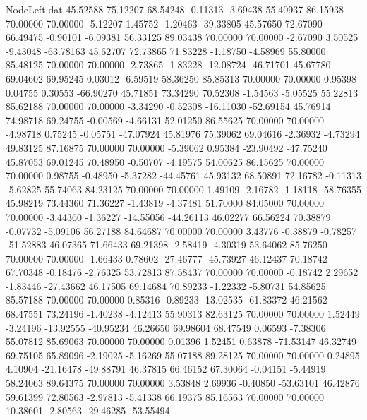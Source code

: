 \begin{filecontents}{NodeLeft.dat}
  45.52588   75.12207   68.54248    -0.11313   -3.69438   55.40937   86.15938   70.00000   70.00000   -5.12207    1.45752   -1.20463  -39.33805
  45.57650   72.67090   66.49475    -0.90101   -6.09381   56.33125   89.03438   70.00000   70.00000   -2.67090    3.50525   -9.43048  -63.78163
  45.62707   72.73865   71.83228    -1.18750   -4.58969   55.80000   85.48125   70.00000   70.00000   -2.73865   -1.83228  -12.08724  -46.71701
  45.67780   69.04602   69.95245     0.03012   -6.59519   58.36250   85.85313   70.00000   70.00000    0.95398    0.04755    0.30553  -66.90270
  45.71851   73.34290   70.52308    -1.54563   -5.05525   55.22813   85.62188   70.00000   70.00000   -3.34290   -0.52308  -16.11030  -52.69154
  45.76914   74.98718   69.24755    -0.00569   -4.66131   52.01250   86.55625   70.00000   70.00000   -4.98718    0.75245   -0.05751  -47.07924
  45.81976   75.39062   69.04616    -2.36932   -4.73294   49.83125   87.16875   70.00000   70.00000   -5.39062    0.95384  -23.90492  -47.75240
  45.87053   69.01245   70.48950    -0.50707   -4.19575   54.00625   86.15625   70.00000   70.00000    0.98755   -0.48950   -5.37282  -44.45761
  45.93132   68.50891   72.16782    -0.11313   -5.62825   55.74063   84.23125   70.00000   70.00000    1.49109   -2.16782   -1.18118  -58.76355
  45.98219   73.44360   71.36227    -1.43819   -4.37481   51.70000   84.05000   70.00000   70.00000   -3.44360   -1.36227  -14.55056  -44.26113
  46.02277   66.56224   70.38879    -0.07732   -5.09106   56.27188   84.64687   70.00000   70.00000    3.43776   -0.38879   -0.78257  -51.52883
  46.07365   71.66433   69.21398    -2.58419   -4.30319   53.64062   85.76250   70.00000   70.00000   -1.66433    0.78602  -27.46777  -45.73927
  46.12437   70.18742   67.70348    -0.18476   -2.76325   53.72813   87.58437   70.00000   70.00000   -0.18742    2.29652   -1.83446  -27.43662
  46.17505   69.14684   70.89233    -1.22332   -5.80731   54.85625   85.57188   70.00000   70.00000    0.85316   -0.89233  -13.02535  -61.83372
  46.21562   68.47551   73.24196    -1.40238   -4.12413   55.90313   82.63125   70.00000   70.00000    1.52449   -3.24196  -13.92555  -40.95234
  46.26650   69.98604   68.47549     0.06593   -7.38306   55.07812   85.69063   70.00000   70.00000    0.01396    1.52451    0.63878  -71.53147
  46.32749   69.75105   65.89096    -2.19025   -5.16269   55.07188   89.28125   70.00000   70.00000    0.24895    4.10904  -21.16478  -49.88791
  46.37815   66.46152   67.30064    -0.04151   -5.44919   58.24063   89.64375   70.00000   70.00000    3.53848    2.69936   -0.40850  -53.63101
  46.42876   59.61399   72.80563    -2.97813   -5.41338   66.19375   85.16563   70.00000   70.00000   10.38601   -2.80563  -29.46285  -53.55494

\end{filecontents}
